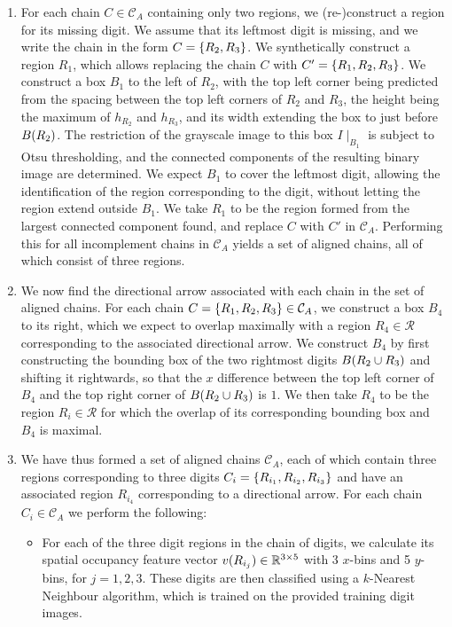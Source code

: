 \documentclass{article}
\begin{document}
\begin{enumerate}
\item
  For each chain $C \in \mathcal{C}_{A}$ containing only two regions, we
  (re-)construct a region for its missing digit.
  We assume that its leftmost digit is missing, and we write the chain in
  the form $C = \lbrace R_{2}, R_{3}\rbrace$.
  We synthetically construct a region $R_{1}$, which allows replacing the chain
  $C$ with $C' = \lbrace R_{1}, R_{2}, R_{3}\rbrace$.
  We construct a box $B_{1}$ to the left of $R_{2}$, with the top left corner
  being predicted from the spacing between the top left corners of $R_{2}$ and
  $R_{3}$, the height being the maximum of $h_{R_{2}}$ and $h_{R_{3}}$, and its
  width extending the box to just before $B(R_{2})$.
  The restriction of the grayscale image to this box $I\mid_{B_{1}}$ is subject
  to Otsu thresholding, and the connected components of the resulting binary
  image are determined.
  We expect $B_{1}$ to cover the leftmost digit, allowing the identification of
  the region corresponding to the digit, without letting the region extend
  outside $B_{1}$.
  We take $R_{1}$ to be the region formed from the largest connected component
  found, and replace $C$ with $C'$ in $\mathcal{C}_{A}$.
  Performing this for all incomplement chains in $\mathcal{C}_{A}$ yields a set
  of aligned chains, all of which consist of three regions.

\item
  We now find the directional arrow associated with each chain in the set of
  aligned chains.
  For each chain $C = \lbrace R_{1}, R_{2}, R_{3}\rbrace \in \mathcal{C}_{A}$, we
  construct a box $B_{4}$ to its right, which we expect to overlap maximally
  with a region $R_{4} \in \mathcal{R}$ corresponding to the associated
  directional arrow.
  We construct $B_{4}$ by first constructing the bounding box of the two
  rightmost digits $B(R_{2} \cup R_{3})$ and shifting it rightwards, so that
  the $x$ difference between the top left corner of $B_{4}$ and the top right
  corner of $B(R_{2} \cup R_{3})$ is $1$.
  We then take $R_{4}$ to be the region $R_{i} \in \mathcal{R}$ for which the
  overlap of its corresponding bounding box and $B_{4}$ is maximal.

\item
  We have thus formed a set of aligned chains $\mathcal{C}_{A}$, each of which
  contain three regions corresponding to three digits
  $C_{i} = \lbrace R_{i_{1}}, R_{i_{2}}, R_{i_{3}}\rbrace$ and have an associated
  region $R_{i_{4}}$ corresponding to a directional arrow.
  For each chain $C_{i} \in \mathcal{C}_{A}$ we perform the following:
  \begin{itemize}
  \item
    For each of the three digit regions in the chain of digits, we calculate its
    spatial occupancy feature vector $v(R_{i_{j}}) \in \mathbb{R}^{3 \times 5}$
    with 3 $x$-bins and 5 $y$-bins, for $j = 1, 2, 3$.
    These digits are then classified using a $k$-Nearest Neighbour algorithm,
    which is trained on the provided training digit images.


\end{itemize}
\end{enumerate}
\end{document}
